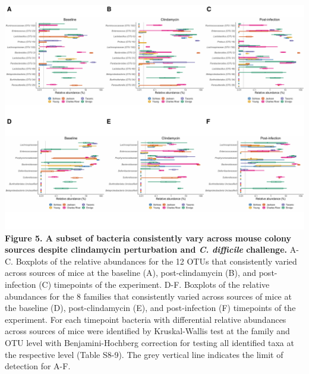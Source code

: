 \documentclass[11pt,]{article}
\begin{document}
\includegraphics{figure_5.pdf} \textbf{Figure 5. A subset of bacteria
consistently vary across mouse colony sources despite clindamycin
perturbation and \emph{C. difficile} challenge.} A-C. Boxplots of the
relative abundances for the 12 OTUs that consistently varied across
sources of mice at the baseline (A), post-clindamycin (B), and
post-infection (C) timepoints of the experiment. D-F. Boxplots of the
relative abundances for the 8 families that consistently varied across
sources of mice at the baseline (D), post-clindamycin (E), and
post-infection (F) timepoints of the experiment. For each timepoint
bacteria with differential relative abundances across sources of mice
were identified by Kruskal-Wallis test at the family and OTU level with
Benjamini-Hochberg correction for testing all identified taxa at the
respective level (Table S8-9). The grey vertical line indicates the
limit of detection for A-F.

\newpage
\end{document}
